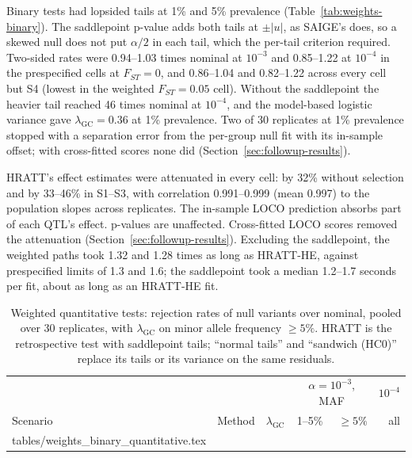 \documentclass[11pt]{article}
\makeatletter
\newcommand{\lgc}{\lambda_{\mathrm{GC}}}
\newcommand{\tabinput}[1]{\@@input #1 }
\makeatother
\begin{document}
Binary tests had lopsided tails at 1\% and 5\% prevalence
(Table~\ref{tab:weights-binary}). The saddlepoint p-value adds both tails at
$\pm|u|$, as SAIGE's does, so a skewed null does not put $\alpha/2$ in each
tail, which the per-tail criterion required. Two-sided rates were 0.94--1.03
times nominal at $10^{-3}$ and 0.85--1.22 at $10^{-4}$ in the prespecified
cells at $F_{ST}=0$, and 0.86--1.04 and 0.82--1.22 across every cell but
S4 (lowest in the weighted $F_{ST}=0.05$ cell).
Without the saddlepoint the heavier tail reached 46 times nominal at
$10^{-4}$, and the model-based logistic variance gave $\lgc=0.36$ at 1\%
prevalence. Two of 30 replicates at 1\% prevalence stopped with a
separation error from the per-group null fit with its in-sample offset;
with cross-fitted scores none did (Section~\ref{sec:followup-results}).

HRATT's effect estimates were attenuated in every cell: by 32\% without
selection and by 33--46\% in S1--S3, with correlation 0.991--0.999
(mean 0.997) to the population slopes across replicates. The in-sample LOCO prediction absorbs part of each QTL's effect.
p-values are unaffected. Cross-fitted LOCO scores removed the attenuation
(Section~\ref{sec:followup-results}).
Excluding the saddlepoint, the weighted paths took 1.32 and 1.28 times as
long as HRATT-HE, against prespecified limits of 1.3 and 1.6; the saddlepoint
took a median 1.2--1.7 seconds per fit, about as long as an HRATT-HE fit.

\begin{table}[htbp]
 \centering\small
 \caption{Weighted quantitative tests: rejection rates of null variants over
 nominal, pooled over 30 replicates, with $\lgc$ on minor allele frequency
 $\ge5\%$. HRATT is the retrospective test with saddlepoint tails; ``normal
 tails'' and ``sandwich (HC0)'' replace its tails or its variance on the same
 residuals.}
 \label{tab:weights-quantitative}
 \begin{tabular}{@{}llrrrr@{}}
 \toprule
 & & & \multicolumn{2}{c}{$\alpha=10^{-3}$, MAF} & $10^{-4}$ \\
 Scenario & Method & $\lgc$ & 1--5\% & $\ge5\%$ & all \\
 \midrule
 \tabinput{tables/weights_binary_quantitative.tex}
 \bottomrule
 \end{tabular}
\end{table}
\end{document}
